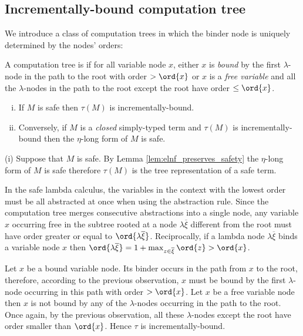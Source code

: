 \subsection*{Incrementally-bound computation tree}

We introduce a class of computation trees in which the binder node
is uniquely determined by the nodes' orders:
\begin{definition}\rm
  A computation tree is  if for all
  variable node $x$, either $x$ is \emph{bound} by the first
  $\lambda$-node in the path to the root with order $> \ord{x}$ or $x$
  is a \emph{free variable} and all the $\lambda$-nodes in the path to
  the root except the root have order $\leq \ord{x}$.
\end{definition}

\begin{proposition} \hfill
\label{prop:safe_imp_incrbound}
\begin{enumerate}[(i)]
\item If $M$ is safe then $\tau(M)$ is incrementally-bound.
\item Conversely, if $M$ is a \emph{closed} simply-typed term and $\tau(M)$
is incrementally-bound then the $\eta$-long form of $M$ is safe.
\end{enumerate}
\end{proposition}
\proof
  (i) Suppose that $M$ is safe. By Lemma
  \ref{lem:elnf_preserves_safety} the $\eta$-long form of $M$ is safe
  therefore $\tau(M)$ is the tree representation of a safe term.

In the safe lambda calculus, the variables in the context with the
lowest order must be all abstracted at once when using the
abstraction rule. Since the computation tree merges consecutive
abstractions into a single node, any variable $x$ occurring free in
the subtree rooted at a node $\lambda \overline{\xi}$ different from
the root must have order greater or equal to $\ord{\lambda
  \overline{\xi}}$. Reciprocally, if a lambda node $\lambda
\overline{\xi}$ binds a variable node $x$ then $\ord{\lambda
  \overline{\xi}} = 1+\max_{z\in\overline{\xi}} \ord{z} > \ord{x}$.

Let $x$ be a bound variable node. Its binder occurs in the path from
$x$ to the root, therefore, according to the previous observation,
$x$ must be bound by the first $\lambda$-node occurring in this path
with order $>\ord{x}$. Let $x$ be a free variable node then $x$ is
not bound by any of the $\lambda$-nodes occurring in the path to the
root. Once again, by the previous observation, all these
$\lambda$-nodes except the root have order smaller than $\ord{x}$.
Hence $\tau$ is incrementally-bound.

